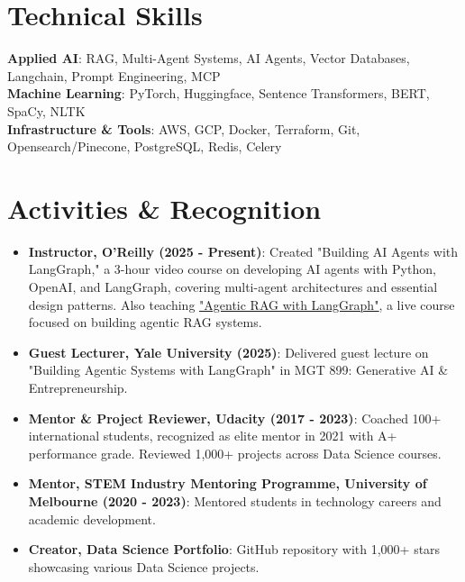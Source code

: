 \documentclass[letterpaper,11pt]{article}
\newcommand{\resumeItem}[1]{
  \item\small{
    {#1 \vspace{-2pt}}
  }
}
\newcommand{\resumeItemListStart}{\begin{itemize}}
\newcommand{\resumeItemListEnd}{\end{itemize}\vspace{-5pt}}
\begin{document}
\section{Technical Skills}
 \begin{itemize}[leftmargin=0.15in, label={}]
    \small{\item{
     \textbf{Applied AI}{: RAG, Multi-Agent Systems, AI Agents, Vector Databases, Langchain, Prompt Engineering, MCP} \\
     \textbf{Machine Learning}{: PyTorch, Huggingface, Sentence Transformers, BERT, SpaCy, NLTK} \\
     \textbf{Infrastructure \& Tools}{: AWS, GCP, Docker, Terraform, Git, Opensearch/Pinecone, PostgreSQL, Redis, Celery} \\
    }}
 \end{itemize}

\section{Activities \& Recognition}
\resumeItemListStart
  \resumeItem{\textbf{Instructor, O'Reilly (2025 - Present)}{: Created "Building AI Agents with LangGraph," a 3-hour video course on developing AI agents with Python, OpenAI, and LangGraph, covering multi-agent architectures and essential design patterns. Also teaching \href{https://learning.oreilly.com/live-events/agentic-rag-with-langgraph/0642572176174/}{\underline{"Agentic RAG with LangGraph"}}, a live course focused on building agentic RAG systems.} \\}
  \resumeItem{\textbf{Guest Lecturer, Yale University (2025)}{: Delivered guest lecture on "Building Agentic Systems with LangGraph" in MGT 899: Generative AI \& Entrepreneurship.} \\}
  \resumeItem{\textbf{Mentor \& Project Reviewer, Udacity (2017 - 2023)}{: Coached 100+ international students, recognized as elite mentor in 2021 with A+ performance grade. Reviewed 1,000+ projects across Data Science courses.} \\}
  \resumeItem{\textbf{Mentor, STEM Industry Mentoring Programme, University of Melbourne (2020 - 2023)}{: Mentored students in technology careers and academic development.} \\}
  \resumeItem{\textbf{Creator, Data Science Portfolio}{: GitHub repository with 1,000+ stars showcasing various Data Science projects.} \\}
\resumeItemListEnd
\end{document}

